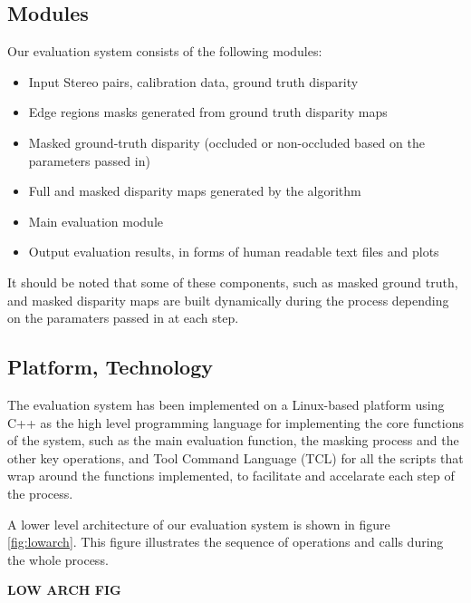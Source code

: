 \subsection{Modules}
Our evaluation system consists of the following modules:

\begin{itemize}
\item Input Stereo pairs, calibration data, ground truth disparity
\item Edge regions masks generated from ground truth disparity maps
\item Masked ground-truth disparity (occluded or non-occluded based on the parameters passed in)
\item Full and masked disparity maps generated by the algorithm 
\item Main evaluation module
\item Output evaluation results, in forms of human readable text files and plots
\end{itemize}

It should be noted that some of these components, such as masked ground truth, and masked disparity maps 
are built dynamically during the process depending on the paramaters passed in at each step.

\subsection{Platform, Technology}
The evaluation system has been implemented on a Linux-based platform using C++ as the high level programming language for implementing 
the core functions of the system, such as the main evaluation function, 
the masking process and the other key operations, 
and Tool Command Language (TCL) for all the scripts that wrap around the functions implemented, 
to facilitate and accelarate each step of the process.

A lower level architecture of our evaluation system is shown in figure \ref{fig:lowarch}. This figure illustrates the 
sequence of operations and calls during the whole process. 

\textbf{LOW ARCH FIG}

